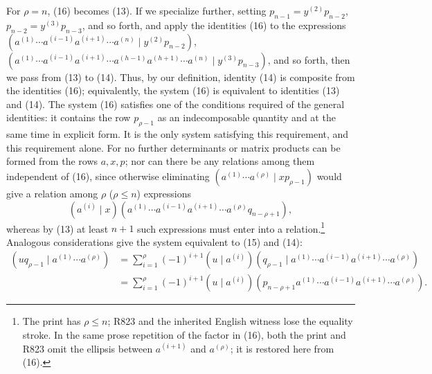 \documentclass[10pt]{article}
\newcommand{\pair}[2]{(#1\mid #2)}
\begin{document}
For $\rho=n$, (16) becomes (13). If we specialize further, setting $p_{n-1}=y^{(2)}p_{n-2}$, $p_{n-2}=y^{(3)}p_{n-3}$, and so forth, and apply the identities (16) to the expressions $(a^{(1)}\cdots a^{(i-1)}a^{(i+1)}\cdots a^{(n)}\mid y^{(2)}p_{n-2})$, $(a^{(1)}\cdots a^{(i-1)}a^{(i+1)}\cdots a^{(h-1)}a^{(h+1)}\cdots a^{(n)}\mid y^{(3)}p_{n-3})$, and so forth, then we pass from (13) to (14). Thus, by our definition, identity (14) is composite from the identities (16); equivalently, the system (16) is equivalent to identities (13) and (14). The system (16) satisfies one of the conditions required of the general identities: it contains the row $p_{\rho-1}$ as an indecomposable quantity and at the same time in explicit form. It is the only system satisfying this requirement, and this requirement alone. For no further determinants or matrix products can be formed from the rows $a,x,p$; nor can there be any relations among them independent of (16), since otherwise eliminating $(a^{(1)}\cdots a^{(\rho)}\mid xp_{\rho-1})$ would give a relation among $\rho$ ($\rho\le n$) expressions
\[
\pair{a^{(i)}}{x}(a^{(1)}\cdots a^{(i-1)}a^{(i+1)}\cdots a^{(\rho)}q_{n-\rho+1}),
\]
whereas by (13) at least $n+1$ such expressions must enter into a relation.\footnote{The print has $\rho\le n$; R823 and the inherited English witness lose the equality stroke. In the same prose repetition of the factor in (16), both the print and R823 omit the ellipsis between $a^{(i+1)}$ and $a^{(\rho)}$; it is restored here from (16).} Analogous considerations give the system equivalent to (15) and (14):
\begin{equation}
\begin{aligned}
\pair{u q_{\rho-1}}{a^{(1)}\cdots a^{(\rho)}}
 &=\sum_{i=1}^{\rho}(-1)^{i+1}\pair{u}{a^{(i)}}(q_{\rho-1}\mid a^{(1)}\cdots a^{(i-1)}a^{(i+1)}\cdots a^{(\rho)})\\
 &=\sum_{i=1}^{\rho}(-1)^{i+1}\pair{u}{a^{(i)}}(p_{n-\rho+1}a^{(1)}\cdots a^{(i-1)}a^{(i+1)}\cdots a^{(\rho)}).
\end{aligned}
\tag{17}
\end{equation}
\end{document}

